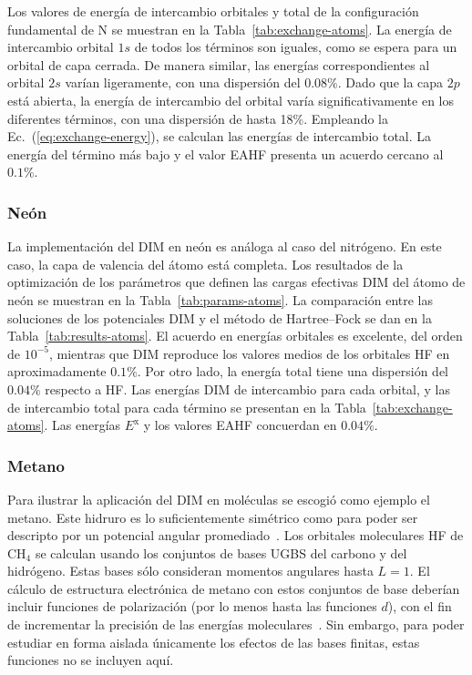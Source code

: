 Los valores de energía de intercambio orbitales y total de la 
configuración fundamental de N se muestran en la 
Tabla~\ref{tab:exchange-atoms}. La energía de intercambio orbital $1s$ 
de todos los términos son iguales, como se espera para un orbital de 
capa cerrada. De manera similar, las energías correspondientes al 
orbital $2s$ varían ligeramente, con una dispersión del $0.08\%$. 
Dado que la capa $2p$ está abierta, la energía de intercambio del 
orbital varía significativamente en los diferentes términos, con una 
dispersión de hasta 18\%. Empleando la Ec.~(\ref{eq:exchange-energy}), 
se calculan las energías de intercambio total. La energía del término 
más bajo y el valor EAHF presenta un acuerdo cercano al $0.1\%$.

\subsubsection{Neón}

La implementación del DIM en neón es análoga al caso del nitrógeno. En
este caso, la capa de valencia del átomo está completa. Los resultados 
de la optimización de los parámetros que definen las cargas efectivas 
DIM del átomo de neón se muestran en la Tabla~\ref{tab:params-atoms}. La 
comparación entre las soluciones de los potenciales DIM y el método de 
Hartree--Fock se dan en la Tabla~\ref{tab:results-atoms}. El acuerdo en 
energías orbitales es excelente, del orden de $10^{-5}$, 
mientras que DIM reproduce los valores medios de los orbitales HF en 
aproximadamente $0.1\%$. Por otro lado, la energía total tiene una 
dispersión del $0.04\%$ respecto a HF. Las energías DIM de intercambio 
para cada orbital, y las de intercambio total para cada término se 
presentan en la Tabla~\ref{tab:exchange-atoms}. Las energías 
$E^{\mathrm{x}}$ y los valores EAHF concuerdan en $0.04\%$.

\subsubsection{Metano}

Para ilustrar la aplicación del DIM en moléculas se escogió como ejemplo 
el metano. Este hidruro es lo suficientemente simétrico como para poder 
ser descripto por un potencial angular promediado~\cite{Granados:16}. 
Los orbitales moleculares HF de CH$_4$ se calculan usando los conjuntos 
de bases UGBS del carbono y del hidrógeno. Estas bases sólo consideran 
momentos angulares hasta $L=1$. El cálculo de estructura electrónica de 
metano con estos conjuntos de base deberían incluir funciones de 
polarización (por lo menos hasta las funciones $d$), con el fin de 
incrementar la precisión de las energías 
moleculares~\cite{Rothenberg:71,Hariharan:72}. Sin embargo, para poder 
estudiar en forma aislada únicamente los efectos de las bases finitas, 
estas funciones no se incluyen aquí. 

